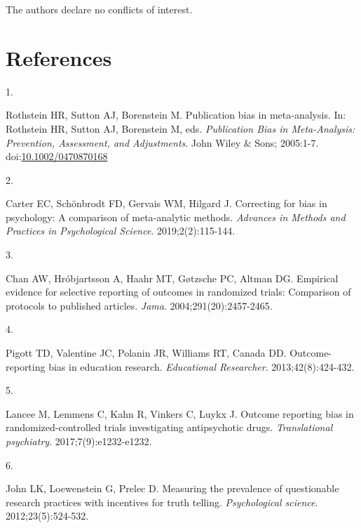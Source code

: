 \documentclass[
  american,
  man, donotrepeattitle,floatsintext]{apa7}
\newlength{\cslhangindent}
\newlength{\csllabelwidth}
\newenvironment{CSLReferences}[2] %
 {\begin{list}{}{%
  \setlength{\itemindent}{0pt}
  \setlength{\leftmargin}{0pt}
  \setlength{\parsep}{0pt}
  \ifodd #1
   \setlength{\leftmargin}{\cslhangindent}
   \setlength{\itemindent}{-1\cslhangindent}
  \fi
  \setlength{\itemsep}{#2\baselineskip}}}
 {\end{list}}
\newcommand{\CSLLeftMargin}[1]{\parbox[t]{\csllabelwidth}{\strut#1\strut}}
\newcommand{\CSLRightInline}[1]{\parbox[t]{\linewidth - \csllabelwidth}{\strut#1\strut}}
\begin{document}
The authors declare no conflicts of interest.

\section*{References}\label{references}

\begingroup
\singlespacing
\setlength{\parindent}{-0.5in}
\setlength{\leftskip}{0.5in}

\protect{}\label{refs}
\begin{CSLReferences}{0}{1}
\CSLLeftMargin{1. }%
\CSLRightInline{Rothstein HR, Sutton AJ, Borenstein M. Publication bias in meta-analysis. In: Rothstein HR, Sutton AJ, Borenstein M, eds. \emph{Publication {Bias} in {Meta-Analysis}: {Prevention}, {Assessment}, and {Adjustments}}. {John Wiley \& Sons}; 2005:1-7. doi:\href{https://doi.org/10.1002/0470870168}{10.1002/0470870168}}

\CSLLeftMargin{2. }%
\CSLRightInline{Carter EC, Schönbrodt FD, Gervais WM, Hilgard J. Correcting for bias in psychology: A comparison of meta-analytic methods. \emph{Advances in Methods and Practices in Psychological Science}. 2019;2(2):115-144.}

\CSLLeftMargin{3. }%
\CSLRightInline{Chan AW, Hróbjartsson A, Haahr MT, Gøtzsche PC, Altman DG. Empirical evidence for selective reporting of outcomes in randomized trials: Comparison of protocols to published articles. \emph{Jama}. 2004;291(20):2457-2465.}

\CSLLeftMargin{4. }%
\CSLRightInline{Pigott TD, Valentine JC, Polanin JR, Williams RT, Canada DD. Outcome-reporting bias in education research. \emph{Educational Researcher}. 2013;42(8):424-432.}

\CSLLeftMargin{5. }%
\CSLRightInline{Lancee M, Lemmens C, Kahn R, Vinkers C, Luykx J. Outcome reporting bias in randomized-controlled trials investigating antipsychotic drugs. \emph{Translational psychiatry}. 2017;7(9):e1232-e1232.}

\CSLLeftMargin{6. }%
\CSLRightInline{John LK, Loewenstein G, Prelec D. Measuring the prevalence of questionable research practices with incentives for truth telling. \emph{Psychological science}. 2012;23(5):524-532.}


\end{CSLReferences}
\end{document}
